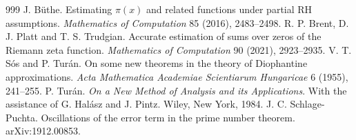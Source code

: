 \begin{thebibliography}{999}
 J. B\"uthe. Estimating $\pi(x)$ and related functions under partial RH assumptions. \emph{Mathematics of Computation} 85 (2016), 2483--2498.
 R. P. Brent, D. J. Platt and T. S. Trudgian. Accurate estimation of sums over zeros of the Riemann zeta function. \emph{Mathematics of Computation} 90 (2021), 2923--2935.
 V. T. S\'os and P. Tur\'an. On some new theorems in the theory of Diophantine approximations. \emph{Acta Mathematica Academiae Scientiarum Hungaricae} 6 (1955), 241--255.
 P. Tur\'an. \emph{On a New Method of Analysis and its Applications}. With the assistance of G. Hal\'asz and J. Pintz. Wiley, New York, 1984.
 J. C. Schlage-Puchta. Oscillations of the error term in the prime number theorem. arXiv:1912.00853.


\end{thebibliography}
